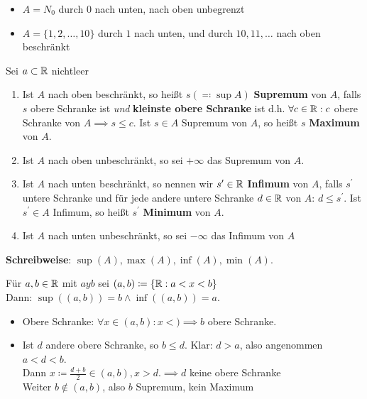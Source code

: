 \documentclass[consecutivenumbering]{gadsescript}
\begin{document}
\begin{subexample}
	\begin{itemize}
		\item $ A = N_0 $ durch $ 0 $ nach unten, nach oben unbegrenzt
		\item $ A = \{ 1, 2, \dotsc, 10\} $ durch $ 1 $ nach unten, und durch $ 10, 11, \dotsc $ nach oben beschränkt
	\end{itemize}
\end{subexample}

\begin{subdefinition}
	Sei $ a \subset \mathbb{R} $ nichtleer
	\begin{enumerate}[label=(\roman*)]
		\item Ist $ A $ nach oben beschränkt, so heißt $ s ( \eqqcolon \operatorname{sup}A) $ \textbf{Supremum} von $ A $, falls $ s $ obere Schranke ist \textit{und} \textbf{kleinste obere Schranke} ist d.h. $ \forall c \in \mathbb{R} : c $ obere Schranke von $ A \implies s \leq c $. Ist $ s \in A $ Supremum von $ A $, so heißt $ s $ \textbf{Maximum} von $ A $.
		\item Ist $ A $ nach oben unbeschränkt, so sei $ + \infty $ das Supremum von $ A $.
		\item Ist $ A $ nach unten beschränkt, so nennen wir $ s^\prime \in \mathbb{R} $ \textbf{Infimum} von $ A $, falls $ s^\prime$ untere Schranke und für jede andere untere Schranke $ d \in \mathbb{R} $ von $ A $: $ d \leq s^\prime $. Ist $ s^\prime \in A $ Infimum, so heißt $ s^\prime $ \textbf{Minimum} von $ A $.
		\item Ist $ A $ nach unten unbeschränkt, so sei $ - \infty $ das Infimum von $ A $
	\end{enumerate}
	\textbf{Schreibweise}: $ \sup(A), \max(A), \inf(A), \min(A)$.
\end{subdefinition}

\begin{subexample}
	Für $ a, b \in \mathbb{R} $ mit $ a y b $ sei $ ( a, b ) \coloneqq \{ \mathbb{R} : a < x < b \} $\\
	Dann: $ \sup((a,b)) = b \wedge \inf((a,b)) = a $.
	\begin{itemize}
		\item Obere Schranke: $ \forall x \in (a,b) : x <  ) \implies b $ obere Schranke.
		\item Ist $ d $ andere obere Schranke, so $ b \leq d $. Klar: $ d > a $, also angenommen $ a < d < b $.\\
			Dann $ x \coloneqq \frac{d+b}{2} \in ( a, b), x > d. \implies d $ keine obere Schranke \Lightning\\
			Weiter $ b \notin (a, b) $, also $ b $ Supremum, kein Maximum
	\end{itemize}
\end{subexample}
\end{document}
